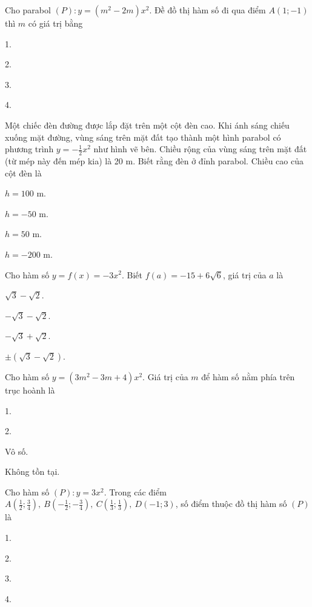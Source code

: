 \documentclass[%
    fontsize=12pt,%
    chapterprefix=false,%
    open=right,%
    twoside=false,%
    numbers=noenddot,%
    headings=optiontohead,%
    final,%
    DIV=15,%
    parskip=half %
]{scrbook}
\begin{document}
\begin{tracnghiem}
\item Cho parabol $(P): y = (m^2 - 2m)x^2$. Đề đồ thị hàm số đi qua điểm $ A(1; -1) $ thì $ m $ có giá trị bằng
\begin{options}
  \item 1.
  \item 2.
  \item 3.
  \item 4.
\end{options}

\item Một chiếc đèn đường được lắp đặt trên một cột đèn cao. Khi ánh sáng chiếu xuống mặt đường, vùng sáng trên mặt đất tạo thành một hình parabol có phương trình $ y = -\frac{1}{2}x^2 $ như hình vẽ bên. Chiều rộng của vùng sáng trên mặt đất (từ mép này đến mép kia) là 20 m. Biết rằng đèn ở đỉnh parabol. Chiều cao của cột đèn là
\begin{options}
  \item $ h = 100 $ m.
  \item $ h = -50 $ m.
  \item $ h = 50 $ m.
  \item $ h = -200 $ m.
\end{options}

\item Cho hàm số $ y = f(x) = -3x^2 $. Biết $ f(a) = -15 + 6\sqrt{6} $, giá trị của $ a $ là
\begin{options}
  \item $ \sqrt{3} - \sqrt{2} $.
  \item $ -\sqrt{3} - \sqrt{2} $.
  \item $ -\sqrt{3} + \sqrt{2} $.
  \item $ \pm(\sqrt{3} - \sqrt{2}) $.
\end{options}

\item Cho hàm số $ y = (3m^2 - 3m + 4)x^2 $. Giá trị của $ m $ để hàm số nằm phía trên trục hoành là
\begin{options}
  \item 1.
  \item 2.
  \item Vô số.
  \item Không tồn tại.
\end{options}

\item Cho hàm số $(P): y = 3x^2$. Trong các điểm $ A\left(\frac{1}{2}; \frac{3}{4}\right),\ B\left(-\frac{1}{2}; -\frac{3}{4}\right),\ C\left(\frac{1}{3}; \frac{1}{3}\right),\ D(-1; 3) $, số điểm thuộc đồ thị hàm số $(P)$ là
\begin{options}
  \item 1.
  \item 2.
  \item 3.
  \item 4.
\end{options}


\end{tracnghiem}
\end{document}
